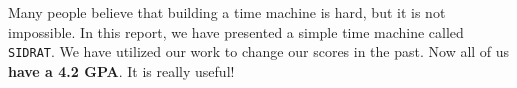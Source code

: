 Many people \cite{Smith_2012} believe that building a time machine is hard, but it is not impossible. In this report, we have presented a simple time machine called \texttt{SIDRAT}. We have utilized our work to change our scores in the past. Now all of us \textbf{have a 4.2 GPA}. It is really useful!
